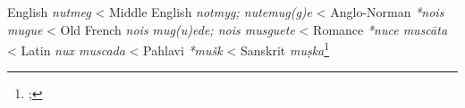 \begin{etymology}\label{ety:nutmeg}
English \textit{nutmeg}
< Middle English \textit{notmyg; nutemug(g)e}
< Anglo-Norman \textit{*nois mugue}
< Old French \textit{nois mug(u)ede; nois musguete}
< Romance \textit{*nuce muscāta}
< Latin \textit{nux muscada}
< Pahlavi \textit{*mušk}
< Sanskrit \textit{muṣka}\footnote{; }
\end{etymology}
